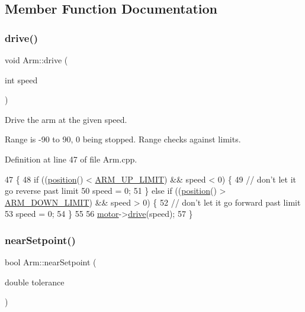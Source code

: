 \subsection{Member Function Documentation}
\mbox{\label{class_arm_a50abf82c871d15bbbfd669b4f33a0d60}} 
\subsubsection{\texorpdfstring{drive()}{drive()}}
{\footnotesize\ttfamily void Arm\+::drive (\begin{DoxyParamCaption}\item[{int}]{speed }\end{DoxyParamCaption})}



Drive the arm at the given speed. 

Range is -\/90 to 90, 0 being stopped. Range checks against limits. 

Definition at line 47 of file Arm.\+cpp.


\begin{DoxyCode}
47                          \{
48     \textcolor{keywordflow}{if} ((\hyperlink{class_arm_a2688295ef2029461e65723d1563f7a28}{position}() < \hyperlink{config_8h_aed2f537d00440893023ce716a04e42fe}{ARM\_UP\_LIMIT}) && speed < 0) \{
49         \textcolor{comment}{// don't let it go reverse past limit}
50         speed = 0;
51     \} \textcolor{keywordflow}{else} \textcolor{keywordflow}{if} ((\hyperlink{class_arm_a2688295ef2029461e65723d1563f7a28}{position}() > \hyperlink{config_8h_aedb68998871fdab10325beeb9dfce002}{ARM\_DOWN\_LIMIT}) && speed > 0) \{
52         \textcolor{comment}{// don't let it go forward past limit}
53         speed = 0;
54     \}
55 
56     \hyperlink{class_arm_aa2ef91b2548b256c65dc92166867ba49}{motor}->\hyperlink{class_v_e_x_motor_ac8ab5c30e4be4a9e3ed290e7827bcf1a}{drive}(speed);
57 \}
\end{DoxyCode}
\mbox{\label{class_arm_a392a83624fdebcb6269695c3600e6c90}} 
\subsubsection{\texorpdfstring{near\+Setpoint()}{nearSetpoint()}}
{\footnotesize\ttfamily bool Arm\+::near\+Setpoint (\begin{DoxyParamCaption}\item[{double}]{tolerance }\end{DoxyParamCaption})}



